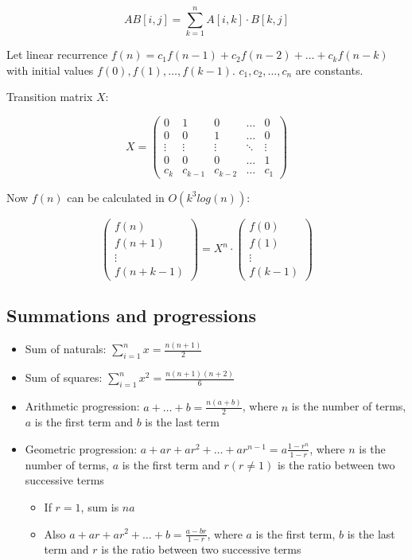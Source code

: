 \documentclass{article}
\begin{document}
\[ AB[i,j] = \sum_{k=1}^{n} A[i,k] \cdot B[k,j] \]

Let linear recurrence $f(n) = c_1f(n-1) + c_2f(n-2) + \dots + c_kf(n-k)$ with initial values $f(0), f(1), \dots, f(k-1)$. $c_1, c_2, \dots, c_n$ are constants.

Transition matrix $X$:

\[
	X =
	\begin{pmatrix}
		0 & 1 & 0 & \dots & 0 \\
		0 & 0 & 1 & \dots & 0 \\
		\vdots & \vdots & \vdots & \ddots & \vdots \\
		0 & 0 & 0 & \dots & 1 \\
		c_k & c_{k-1} & c_{k-2} & \dots & c_1
	\end{pmatrix}
\]

Now $f(n)$ can be calculated in $O(k^3 log(n))$:

\[
	\begin{pmatrix}
		f(n) \\
		f(n+1) \\
		\vdots \\
		f(n+k-1)
	\end{pmatrix}
	= X^n \cdot
	\begin{pmatrix}
		f(0) \\
		f(1) \\
		\vdots \\
		f(k-1)
	\end{pmatrix}
\]



\subsection {Summations and progressions}

\begin{itemize}

	\item Sum of naturals: $\sum_{i=1}^{n} x = \frac{n(n+1)}{2}$
	\item Sum of squares: $\sum_{i=1}^{n} x^2 = \frac{n(n+1)(n+2)}{6}$
	\item Arithmetic progression: $a + \dots + b = \frac{n(a+b)}{2}$, where $n$ is the number of terms, $a$ is the first term and $b$ is the last term
	\item Geometric progression: $a + ar + ar^2 + \dots + ar^{n-1} = a \frac{1-r^n}{1-r}$, where $n$ is the number of terms, $a$ is the first term and $r (r \neq 1)$ is the ratio between two successive terms
	\begin{itemize}
		\item If $r = 1$, sum is $na$
		\item Also $a + ar + ar^2 + \dots + b = \frac{a-br}{1-r}$, where $a$ is the first term, $b$ is the last term and $r$ is the ratio between two successive terms
	\end{itemize}

\end{itemize}
\end{document}

